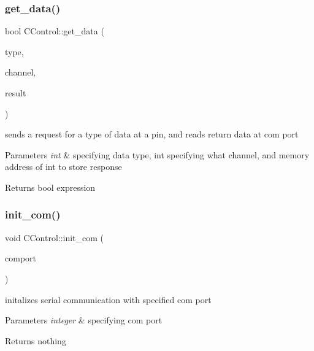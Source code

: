 \subsubsection{\texorpdfstring{get\+\_\+data()}{get\_data()}}
{\footnotesize\ttfamily bool C\+Control\+::get\+\_\+data (\begin{DoxyParamCaption}\item[{int}]{type,  }\item[{int}]{channel,  }\item[{int \&}]{result }\end{DoxyParamCaption})}



sends a request for a type of data at a pin, and reads return data at com port 


\begin{DoxyParams}{Parameters}
{\em int} & specifying data type, int specifying what channel, and memory address of int to store response \\
\hline
\end{DoxyParams}
\begin{DoxyReturn}{Returns}
bool expression 
\end{DoxyReturn}
\hypertarget{class_c_control_a3d1384d0e1ee2a4a478a798b46457468}{}\label{class_c_control_a3d1384d0e1ee2a4a478a798b46457468} 
\subsubsection{\texorpdfstring{init\+\_\+com()}{init\_com()}}
{\footnotesize\ttfamily void C\+Control\+::init\+\_\+com (\begin{DoxyParamCaption}\item[{int}]{comport }\end{DoxyParamCaption})}



initalizes serial communication with specified com port 


\begin{DoxyParams}{Parameters}
{\em integer} & specifying com port \\
\hline
\end{DoxyParams}
\begin{DoxyReturn}{Returns}
nothing 
\end{DoxyReturn}
\hypertarget{class_c_control_a13f557815616ef66a8f5dd4b725d8c32}{}\label{class_c_control_a13f557815616ef66a8f5dd4b725d8c32} 
